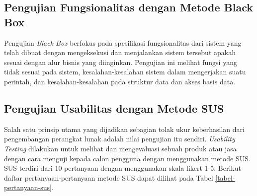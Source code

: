 \subsection{Pengujian Fungsionalitas dengan Metode Black Box}
\par Pengujian \textit{Black Box} berfokus pada spesifikasi fungsionalitas dari sistem yang telah dibuat dengan mengeksekusi dan menjalankan sistem tersebut apakah sesuai dengan alur bisnis yang diinginkan. Pengujian ini melihat fungsi yang tidak sesuai pada sistem, kesalahan-kesalahan sistem dalam mengerjakan suatu perintah, dan kesalahan-kesalahan pada struktur data dan akses basis data. 

\subsection{Pengujian Usabilitas dengan Metode SUS}
\par Salah satu prinsip utama yang dijadikan sebagian tolak ukur keberhasilan dari pengembangan perangkat lunak adalah nilai pengujian itu sendiri. \textit{Usability Testing} dilakukan untuk melihat dan mengevaluasi sebuah produk atau jasa dengan cara menguji kepada calon pengguna dengan menggunakan metode SUS. SUS terdiri dari 10 pertanyaan dengan menggunakan skala likert 1-5. Berikut daftar pertanyaan-pertanyaan metode SUS dapat dilihat pada Tabel \ref{tabel-pertanyaan-sus}.  
